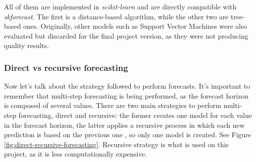 All of them are implemented in \textit{scikit-learn} and are directly compatible with \textit{skforecast}. The first is a distance-based algorithm, while the other two are tree-based ones. Originally, other models such as Support Vector Machines were also evaluated but discarded for the final project version, as they were not producing quality results.

\subsubsection{Direct vs recursive forecasting}
Now let's talk about the strategy followed to perform forecasts. It's important to remember that multi-step forecasting is being performed, as the forecast horizon is composed of several values. There are two main strategies to perform multi-step forecasting, direct and recursive: the former creates one model for each value in the forecast horizon, the latter applies a recursive process in which each new prediction is based on the previous one \cite{direct-recursive-forecasting}, so only one model is created. See Figure \ref{fig:direct-recursive-forecasting}. Recursive strategy is what is used on this project, as it is less computationally expensive.

